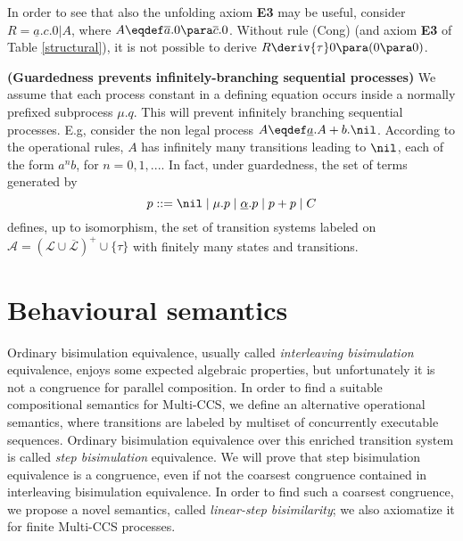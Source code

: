 \begin{example}\label{ax-cons-needed}
In order to see that also the unfolding axiom {\bf E3} may be useful, 
consider $R = \underline{a}.c.0 | A$, where $A \eqdef \overline{a}.0 \para \overline{c}.0$. Without rule (Cong) 
(and axiom {\bf E3} of Table \ref{structural}),
it is not possible to derive $R \deriv{\tau} 0 \para (0 \para 0)$. 
\fine
\end{example}


\begin{remark}\label{guarded-rec}{\bf (Guardedness prevents infinitely-branching sequential processes)} 
We assume that each process constant in a defining equation occurs
inside a normally prefixed subprocess $\mu.q$. This will prevent infinitely branching sequential processes.
E.g, consider the non legal process $A  \eqdef  \underline{a}.A + b.\nil$.
According to the operational rules, $A$ has infinitely many transitions leading to $\nil$, each of the form $a^nb$, for 
$n = 0, 1, ...$. 
In fact, under guardedness, the set of terms generated by 
\[ p ::= \nil \mid  \mu.p \mid  \underline{\alpha}.p \mid p+p  \mid  C\]
defines, up to isomorphism, the set of transition systems labeled on ${\mathcal A} = 
(\mathcal{L} \cup \overline{\mathcal L})^+ \cup \{\tau\}$ with finitely many states and transitions.
\fine
\end{remark}



\section{Behavioural semantics}

Ordinary bisimulation equivalence, usually called {\em interleaving bisimulation} equivalence, 
enjoys some expected algebraic properties, but unfortunately it
is not a congruence for parallel composition. In order to find a suitable compositional semantics for 
Multi-CCS,  we define an alternative operational
semantics, where transitions are labeled by multiset of concurrently executable sequences. Ordinary bisimulation
equivalence 
over this enriched transition system is called {\em step bisimulation} equivalence. 
We will prove that step bisimulation equivalence is a congruence, even if not the coarsest congruence 
contained in interleaving bisimulation equivalence. In order to find such a coarsest congruence,
we propose a novel semantics, called {\em linear-step bisimilarity}; we also axiomatize it for 
finite Multi-CCS processes.

